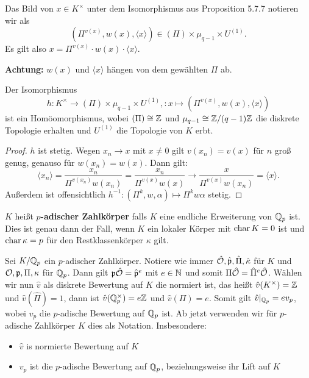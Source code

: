 
\begin{Not}
Das Bild von $x \in K^\times$ unter dem Isomorphismus aus Proposition 5.7.7 notieren wir als
\[ \left( \Pi^{v(x)}, w(x), \langle x \rangle  \right) \in (\Pi) \times \mu_{q-1} \times U^{(1)}.
\]
Es gilt also $ x = \Pi^{v(x)} \cdot w(x) \cdot \langle x \rangle$.

\textbf{Achtung:} $w(x)$ und $\langle x \rangle$ hängen von dem gewählten $\Pi$ ab.
\end{Not}

\begin{Bem}
Der Isomorphismus 
\[ h \colon K^\times \to (\Pi) \times \mu_{q-1} \times U^{(1)},
 \colon x \mapsto \left( \Pi^{v(x)}, w(x), \langle x \rangle  \right)
\]
ist ein Homöomorphismus, wobei $(\Pi) \cong \mathbb{Z}$ und $\mu_{q-1} \cong \mathbb{Z} /(q-1)\mathbb{Z}$ die diskrete Topologie erhalten und $U^{(1)}$ die Topologie von $K$ erbt.
\end{Bem}

\begin{proof}
$h$ ist stetig. Wegen $x_n \to x$ mit $x \neq 0$ gilt $v(x_n) = v(x)$ für $n$ groß genug, genauso für $w(x_n) = w(x)$. Dann gilt:
\[ \langle x_n \rangle 
= \frac{x_n}{\Pi^{v(x_n)}w(x_n)}
= \frac{x_n}{\Pi^{v(x)}w(x)}
\to  \frac{x}{\Pi^{v(x)}w(x_n)}
= \langle x \rangle.
\]
Außerdem ist offensichtlich $h^{-1} \colon \left( \Pi^k, w , \alpha \right) \mapsto \Pi^k w \alpha$ stetig.
\end{proof}

\begin{defi}
$K$ heißt \textbf{$p$-adischer Zahlkörper} falls $K$ eine endliche Erweiterung von $\mathbb{Q}_p$ ist.
Dies ist genau dann der Fall, wenn $K$ ein lokaler Körper mit $\operatorname{char} K=0$ ist und $\operatorname{char} \kappa = p$  für den Restklassenkörper $\kappa$ gilt.
\end{defi}


\begin{Bem}
Sei $K/\mathbb{Q}_p$ ein $p$-adischer Zahlkörper. Notiere wie immer $\hat{\mathcal{O}} , \hat{\mathfrak{p}}, \hat{\Pi}, \hat{\kappa}$ für $K$ und $\mathcal{O}, \mathfrak{p}, \Pi, \kappa$ für $\mathbb{Q}_p$. Dann gilt
$\mathfrak{p} \hat{\mathcal{O}} = \hat{\mathfrak{p}}^e$ mit $e \in \mathbb{N}$ und somit $\Pi\hat{\mathcal{O}} = \hat{\Pi}^e \hat{\mathcal{O}}$.
Wählen wir nun $\hat{v}$ als diskrete Bewertung auf $K$ die normiert ist, das heißt $\hat{v}( K^ \times) = \mathbb{Z}$ und $\hat{v} (\hat{\Pi}) =1$, dann ist $\hat{v}(\mathbb{Q}_p^\times) = e\mathbb{Z}$ und $\hat{v}(\Pi) = e$.
Somit gilt $\hat{v}|_{\mathbb{Q}_p} = ev_p$, wobei $v_p$ die $p$-adische Bewertung auf $\mathbb{Q}_p$ ist.
Ab jetzt verwenden wir für $p$-adische Zahlkörper $K$ dies als Notation. Insbesondere:
\begin{itemize}
\item $\hat{v}$ is normierte Bewertung auf $K$
\item $v_p$ ist die $p$-adische Bewertung auf $\mathbb{Q}_p$, beziehungsweise ihr Lift auf $K$
\end{itemize}
\end{Bem}

